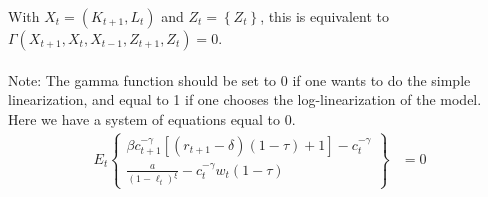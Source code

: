 \documentclass[11pt]{article}
\numberwithin{equation}{section}
\theoremstyle{plain}
\theoremstyle{definition}
\newcommand\braces[1]{\left\{ #1 \right\}}
\newcommand{\1}{\mathbbm 1}
\def\g{\gamma}
\begin{document}
\noindent With $X_t = (K_{t+1}, L_t)$ and $Z_t = \braces{Z_t}$, this is equivalent to 
$\Gamma(X_{t+1}, X_t, X_{t-1}, Z_{t+1}, Z_{t}) = 0$. 
\\
\\
Note: The gamma function should be set to 0 if one wants to do the simple linearization, and equal to 1 if one chooses the log-linearization of the model. 
\\
Here we have a system of equations equal to 0.
\begin{align}
E_{t} \braces{\begin{array}{ll}
              \beta c_{t+1}^{-\g}\left[\left(r_{t+1}-\delta\right)(1-\tau)+1\right] - c_t^{-\g}  \\
              \frac{a}{(1-\ell_t)^{\xi}} - c_t^{-\g} w_{t}(1-\tau)      \end{array}} &= 0
\end{align}
\end{document}
